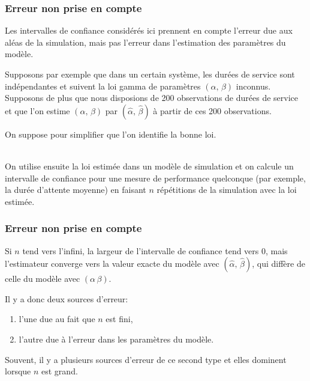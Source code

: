 \documentclass[t,usepdftitle=false]{beamer}
\begin{document}
\begin{frame}
\frametitle{Erreur non prise en compte}

Les intervalles de confiance considérés ici prennent en compte
l'erreur due aux aléas de la simulation, mais pas l'erreur dans
l'estimation des paramètres du modèle.

\mbox{}

Supposons par exemple que dans un certain système, les durées de
service sont indépendantes et suivent la loi gamma de paramètres
$(\alpha,\, \beta)$ inconnus.
Supposons de plus que nous disposions de 200 observations de durées de
service et que l'on estime $(\alpha,\, \beta)$ par $(\hat{\alpha},\,
\hat{\beta})$ à partir de ces 200 observations.

\mbox{}

On suppose pour simplifier que l'on identifie la bonne loi.

\mbox{}
\\
On utilise ensuite la loi estimée dans un modèle de simulation et on
calcule un intervalle de confiance pour une mesure de performance quelconque (par exemple, la durée d'attente moyenne) en faisant $n$ répétitions de la simulation
avec la loi estimée. 

\end{frame}

\begin{frame}
\frametitle{Erreur non prise en compte}

Si $n$ tend vers l'infini, la largeur de l'intervalle de confiance
tend vers 0, mais l'estimateur converge vers la valeur exacte du
modèle avec $(\hat{\alpha},\, \hat{\beta})$, qui diffère de celle du
modèle avec $(\alpha\, \beta)$.

\mbox{}

Il y a donc deux sources d'erreur:
\begin{enumerate}
\item
l'une due au fait que $n$ est fini,
\item
l'autre due à l'erreur dans les paramètres du modèle.
\end{enumerate}

\mbox{}

Souvent, il y a plusieurs sources d'erreur de ce second type et elles
dominent lorsque $n$ est grand.

\end{frame}
\end{document}
